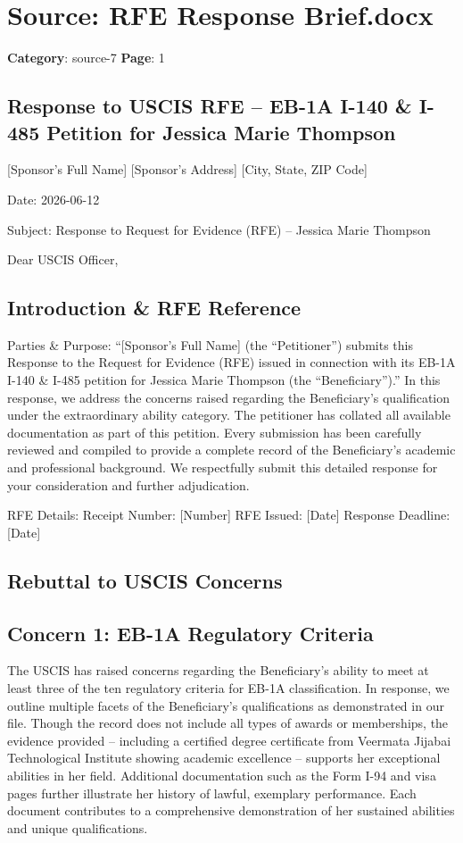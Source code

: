 \section*{Source: RFE Response Brief.docx}
\textbf{Category}: source-7
\textbf{Page}: 1

\subsection*{Response to USCIS RFE – EB-1A I-140 \& I-485 Petition for Jessica Marie Thompson}

[Sponsor’s Full Name]
[Sponsor’s Address]
[City, State, ZIP Code]

Date: 2026-06-12

Subject: Response to Request for Evidence (RFE) – Jessica Marie Thompson

Dear USCIS Officer,

\subsection*{Introduction \& RFE Reference}

Parties \& Purpose:
“[Sponsor’s Full Name] (the “Petitioner”) submits this Response to the Request for Evidence (RFE) issued in connection with its EB-1A I-140 \& I-485 petition for Jessica Marie Thompson (the “Beneficiary”).” In this response, we address the concerns raised regarding the Beneficiary’s qualification under the extraordinary ability category. The petitioner has collated all available documentation as part of this petition. Every submission has been carefully reviewed and compiled to provide a complete record of the Beneficiary’s academic and professional background. We respectfully submit this detailed response for your consideration and further adjudication.

RFE Details:
Receipt Number: [Number]
RFE Issued: [Date]
Response Deadline: [Date]

\subsection*{Rebuttal to USCIS Concerns}

\subsection*{Concern 1: EB-1A Regulatory Criteria}

The USCIS has raised concerns regarding the Beneficiary’s ability to meet at least three of the ten regulatory criteria for EB-1A classification. In response, we outline multiple facets of the Beneficiary’s qualifications as demonstrated in our file. Though the record does not include all types of awards or memberships, the evidence provided – including a certified degree certificate from Veermata Jijabai Technological Institute showing academic excellence – supports her exceptional abilities in her field. Additional documentation such as the Form I-94 and visa pages further illustrate her history of lawful, exemplary performance. Each document contributes to a comprehensive demonstration of her sustained abilities and unique qualifications.

